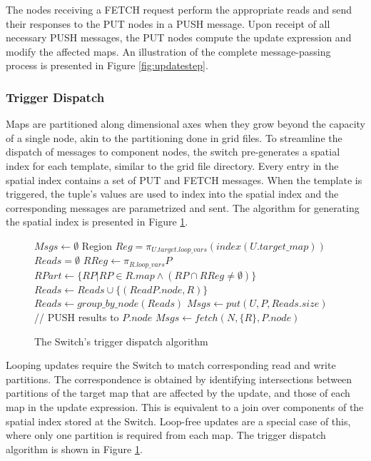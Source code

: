 \documentclass{sig-alternate}
\begin{document}
The nodes receiving a FETCH request perform the appropriate reads and send their responses to the PUT nodes in a PUSH message.  Upon receipt of all necessary PUSH messages, the PUT nodes compute the update expression and modify the affected maps.  An illustration of the complete message-passing process is presented in Figure \ref{fig:updatestep}.  

\subsubsection{Trigger Dispatch}
Maps are partitioned along dimensional axes when they grow beyond the capacity of a single node, akin to the partitioning done in grid files\cite{318586}.  To streamline the dispatch of messages to component nodes, the switch pre-generates a spatial index for each template, similar to the grid file directory.  Every entry in the spatial index contains a set of PUT and FETCH messages.  When the template is triggered, the tuple's values are used to index into the spatial index and the corresponding messages are parametrized and sent.  The algorithm for generating the spatial index is presented in Figure \ref{alg:dispatch}.

\begin{figure}
\begin{algorithmic}[1]
\STATE $Msgs \leftarrow \emptyset$
	\STATE Region $Reg = \pi_{U.target.loop\_vars} \left(index(U.target\_map)\right)$
		\STATE $Reads = \emptyset$
			\STATE $RReg \leftarrow \pi_{R.loop\_vars} P$
			\STATE $RPart \leftarrow \{RP | RP\in R.map \wedge (RP \cap RReg \neq \emptyset)\}$
			\STATE $Reads \leftarrow Reads \cup \{(ReadP.node, R)\}$
		\ENDFOR
		\STATE $Reads \leftarrow group\_by\_node(Reads)$
		\STATE $Msgs \leftarrow put(U, P, Reads.size)$
		  \STATE // PUSH results to $P.node$
			\STATE $Msgs \leftarrow fetch(N, \{R\}, P.node)$
		\ENDFOR
	\ENDFOR
\ENDFOR
\end{algorithmic}
\caption{The Switch's trigger dispatch algorithm}
\label{alg:dispatch}
\end{figure}

Looping updates require the Switch to match corresponding read and write partitions.  The correspondence is obtained by identifying intersections between partitions of the target map that are affected by the update, and those of each map in the update expression.  This is equivalent to a join over components of the spatial index stored at the Switch.  Loop-free updates are a special case of this, where only one partition is required from each map.  The trigger dispatch algorithm is shown in Figure \ref{alg:dispatch}.
\end{document}
